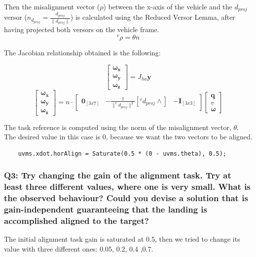 \documentclass{article}
\begin{document}
Then the misalignment vector (\(\rho\)) between the x-axis of the vehicle and the \(d_{proj}\) versor (\(n_{d_{proj}}=\frac{d_{proj}}{\|d_{proj}\|}\)) is calculated using the Reduced Versor Lemma, after having projected both versors on the vehicle frame.
$$^v\rho = \theta n$$

The Jacobian relationship obtained is the following:

$$ \begin{bmatrix} \bm{\omega_x}   \\ \bm{\omega_y} \\ \bm{\omega_z} \end{bmatrix} = J_{ha} \bm{\dot{y}}$$
$$ \begin{bmatrix} \bm{\omega_x}   \\ \bm{\omega_y} \\ \bm{\omega_z} \end{bmatrix} = n \cdot \begin{bmatrix} \bm{0}_{[3x7]} & -\frac{1}{\|^vd_{proj}\|^2}[^vd_{proj}\wedge] & -\bm{I}_{[3x3]} \end{bmatrix} \begin{bmatrix} \bm{q}   \\ \bm{\textit{v}} \\ \bm{\omega} \end{bmatrix} $$

The task reference is computed using the norm of the misalignment vector, $\theta$. The desired value in this case is \(0\), because we want the two vectors to be aligned.

\begin{lstlisting}
	uvms.xdot.horAlign = Saturate(0.5 * (0 - uvms.theta), 0.5);
\end{lstlisting}

\subsubsection{Q3: Try changing the gain of the alignment task. Try at least three different values, where one is very small. What is the observed behaviour? Could you devise a solution that is gain-independent guaranteeing that the landing is accomplished aligned to the target?}
The initial alignment task gain is saturated at 0.5, then we tried to change its value with three different ones: 0.05, 0.2, 0.4 ,0.7.

\begin{figure}[H]
	\centering
	\hspace{10mm}
	\label{im:v_land_gain0_05}
\end{figure} 
\end{document}
